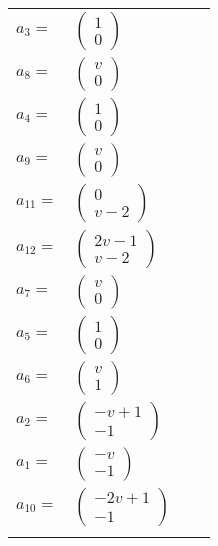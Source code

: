\documentclass[1p]{elsarticle_modified}
\theoremstyle{definition}
\begin{document}
\begin{tabular}{m{7pt} m{180pt} m{7pt} m{180pt} }
\flushright $a_{3}=$&$\begin{pmatrix}1\\0\end{pmatrix}$ \\
\flushright $a_{8}=$&$\begin{pmatrix}v\\0\end{pmatrix}$ \\
\flushright $a_{4}=$&$\begin{pmatrix}1\\0\end{pmatrix}$ \\
\flushright $a_{9}=$&$\begin{pmatrix}v\\0\end{pmatrix}$ \\
\flushright $a_{11}=$&$\begin{pmatrix}0\\v-2\end{pmatrix}$ \\
\flushright $a_{12}=$&$\begin{pmatrix}2 v-1\\v-2\end{pmatrix}$ \\
\flushright $a_{7}=$&$\begin{pmatrix}v\\0\end{pmatrix}$ \\
\flushright $a_{5}=$&$\begin{pmatrix}1\\0\end{pmatrix}$ \\
\flushright $a_{6}=$&$\begin{pmatrix}v\\1\end{pmatrix}$ \\
\flushright $a_{2}=$&$\begin{pmatrix}- v+1\\-1\end{pmatrix}$ \\
\flushright $a_{1}=$&$\begin{pmatrix}- v\\-1\end{pmatrix}$ \\
\flushright $a_{10}=$&$\begin{pmatrix}-2 v+1\\-1\end{pmatrix}$\\&\end{tabular}
\end{document}
